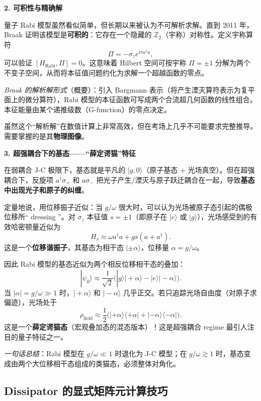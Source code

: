 \textbf{2. 可积性与精确解}

量子 Rabi 模型虽然看似简单，但长期以来被认为不可解析求解。直到 2011 年，Braak 证明该模型是\textbf{可积的}：它存在一个隐藏的 $\mathbb{Z}_2$（宇称）对称性。定义宇称算符
\[
\Pi = -\sigma_z e^{i\pi a^\dagger a},
\]
可以验证 $[H_{\text{Rabi}}, \Pi] = 0$。这意味着 Hilbert 空间可按宇称 $\Pi = \pm 1$ 分解为两个不变子空间，从而将本征值问题约化为求解一个超越函数的零点。

\textit{Braak 的解析解形式}（概要）：引入 Bargmann 表示（将产生湮灭算符表示为复平面上的微分算符），Rabi 模型的本征函数可写成两个合流超几何函数的线性组合。本征能量由某个递推级数（G-function）的零点决定。

虽然这个``解析解''在数值计算上非常高效，但在考场上几乎不可能要求完整推导。需要掌握的是其\textbf{物理图像}。

\textbf{3. 超强耦合下的基态——``薛定谔猫''特征}

在弱耦合 J-C 极限下，基态就是平凡的 $|g,0\rangle$（原子基态 + 光场真空）。但在超强耦合下，反旋项 $a^\dagger\sigma_+$ 和 $a\sigma_-$ 把光子产生/湮灭与原子跃迁耦合在一起，导致\textbf{基态中出现光子和原子的纠缠}。

定量地说，用位移振子近似：当 $g/\omega$ 很大时，可以认为光场被原子态引起的偶极位移所`` dressing ''。对 $\sigma_z$ 本征值 $s=\pm 1$（即原子在 $|e\rangle$ 或 $|g\rangle$），光场感受到的有效哈密顿量近似为
\[
H_s \approx \omega a^\dagger a + g s (a+a^\dagger).
\]
这是一个\textbf{位移谐振子}，其基态为相干态 $|\pm\alpha\rangle$，位移量 $\alpha = g/\omega$。

因此 Rabi 模型的基态近似为两个相反位移相干态的叠加：
\[
|\psi_0\rangle \approx \frac{1}{\sqrt{2}}\bigl( |g\rangle|\!+\!\alpha\rangle - |e\rangle|\!-\!\alpha\rangle \bigr).
\]
当 $|\alpha| = g/\omega \gg 1$ 时，$|\!+\!\alpha\rangle$ 和 $|\!-\!\alpha\rangle$ 几乎正交。若只追踪光场自由度（对原子求偏迹），光场处于
\[
\rho_{\text{field}} \approx \frac{1}{2}\bigl( |+\alpha\rangle\langle+\alpha| + |-\alpha\rangle\langle-\alpha| \bigr).
\]
这是一个\textbf{薛定谔猫态}（宏观叠加态的混态版本）！这是超强耦合 regime 最引人注目的量子特征之一。

\textit{一句话总结}：Rabi 模型在 $g/\omega \ll 1$ 时退化为 J-C 模型；在 $g/\omega \gtrsim 1$ 时，基态变成由两个大位移相干态组成的类猫态，必须整体对角化。

\subsection{Dissipator 的显式矩阵元计算技巧}


